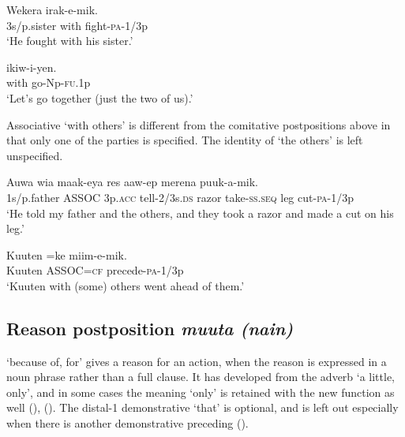\ea%
\label{ex:x752}
\gll Wekera  irak-e-mik. \\
3s/p.sister with fight-\textsc{pa}-1/3p\\
\glt`He fought with his sister.'
\z

\ea%
\label{ex:x753}
\gll {} ikiw-i-yen. \\
with go-Np-\textsc{fu}.1p\\
\glt`Let's go together (just the two of us).'
\z

Associative  `with others' is different from the comitative postpositions above in that only one of the parties is specified. The identity of `the others' is left unspecified.

\ea%
\label{ex:x826}
\gll Auwa  wia maak-eya res aaw-ep merena puuk-a-mik.\\
1s/p.father ASSOC 3p.\textsc{acc} tell-2/3s.\textsc{ds} razor take-\textsc{ss}.\textsc{seq} leg cut-\textsc{pa}-1/3p\\
\glt`He told my father and the others, and they took a razor and made a cut on his leg.'
\z

\ea%
\label{ex:x827}
\gll Kuuten =ke miim-e-mik. \\
Kuuten ASSOC=\textsc{cf} precede-\textsc{pa}-1/3p\\
\glt`Kuuten with (some) others went ahead of them.'
\z

\subsection{Reason postposition \textit{muuta (nain)}}
{}
 `because of, for' gives a reason for an action, when the reason is expressed in a noun phrase rather than a full clause. It has developed from the adverb  `a little, only', and in some cases the meaning `only' is retained with the new function as well (), (). The distal-1 demonstrative  `that' is optional, and is left out especially when there is another demonstrative  preceding  ().

